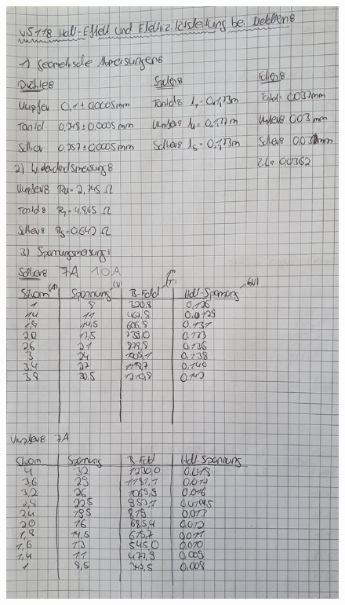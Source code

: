 \begin{figure}[H]
    \centering
    \includegraphics[width=\textwidth]{content/v511_Laborbuch1.jpg}
\end{figure}


